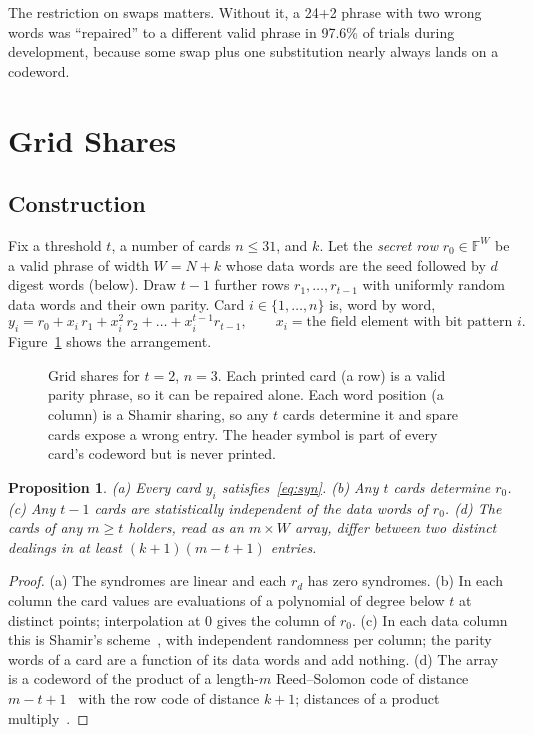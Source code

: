 \documentclass[numeric]{anvil-paper}
\newcommand{\F}{\mathbb{F}}
\newtheorem{proposition}{Proposition}
\begin{document}
The restriction on swaps matters. Without it, a 24+2 phrase with two wrong
words was ``repaired'' to a different valid phrase in 97.6\% of trials during
development, because some swap plus one substitution nearly always lands on a
codeword.

\section{Grid Shares}
\label{sec:grid}

\subsection{Construction}

Fix a threshold $t$, a number of cards $n\le 31$, and $k$. Let the \emph{secret
row} $r_0\in\F^{W}$ be a valid phrase of width $W=N+k$ whose data words are the
seed followed by $d$ digest words (below). Draw $t-1$ further rows
$r_1,\dots,r_{t-1}$ with uniformly random data words and their own parity. Card
$i\in\{1,\dots,n\}$ is, word by word,
\begin{equation}
y_i = r_0 + x_i\,r_1 + x_i^2\,r_2+\dots+x_i^{t-1}r_{t-1},
\qquad x_i = \text{the field element with bit pattern } i .
\label{eq:card}
\end{equation}
Figure~\ref{fig:grid} shows the arrangement.

\begin{figure}[tb]
\centering

\caption{Grid shares for $t=2$, $n=3$. Each printed card (a row) is a valid
parity phrase, so it can be repaired alone. Each word position (a column) is a
Shamir sharing, so any $t$ cards determine it and spare cards expose a wrong
entry. The header symbol is part of every card's codeword but is never
printed.}
\label{fig:grid}
\end{figure}

\begin{proposition}
\label{prop:grid}
(a) Every card $y_i$ satisfies~\eqref{eq:syn}.
(b) Any $t$ cards determine $r_0$.
(c) Any $t-1$ cards are statistically independent of the data words of $r_0$.
(d) The cards of any $m\ge t$ holders, read as an $m\times W$ array, differ
between two distinct dealings in at least $(k+1)(m-t+1)$ entries.
\end{proposition}

\begin{proof}
(a) The syndromes are linear and each $r_d$ has zero syndromes.
(b) In each column the card values are evaluations of a polynomial of degree
below $t$ at distinct points; interpolation at $0$ gives the column of $r_0$.
(c) In each data column this is Shamir's scheme~\citep{shamir1979how}, with
independent randomness per column; the parity words of a card are a function
of its data words and add nothing.
(d) The array is a codeword of the product of a length-$m$ Reed--Solomon code
of distance $m-t+1$~\citep{mceliece1981sharing} with the row code of distance
$k+1$; distances of a product multiply~\citep{elias1954error}.
\end{proof}
\end{document}
